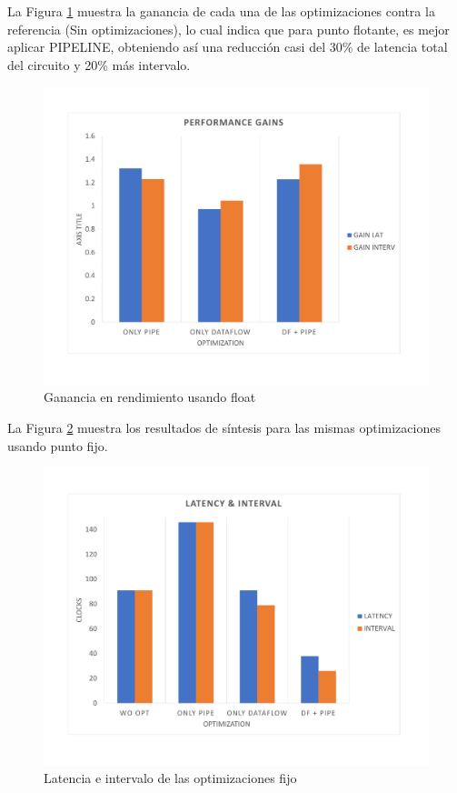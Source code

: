 La Figura \ref{fig:perfGainFloat} muestra la ganancia de cada una de las optimizaciones contra la referencia (Sin optimizaciones), lo cual indica que para punto flotante, es mejor aplicar PIPELINE, obteniendo así una  reducción casi del 30\% de latencia total del circuito y 20\% más intervalo.


\begin{figure}[!ht]
	\centering
		\includegraphics[scale=0.45]{Figures/PERFGAINFLOAT}
	\caption{Ganancia en rendimiento usando float}
	\label{fig:perfGainFloat}
\end{figure}

La Figura \ref{fig:latIntFix} muestra los resultados de síntesis para las mismas optimizaciones usando punto fijo.

\begin{figure}[!ht]
	\centering
		\includegraphics[scale=0.45]{Figures/LATINTFIX}
	\caption{Latencia e intervalo de las optimizaciones fijo}
	\label{fig:latIntFix}
\end{figure}

